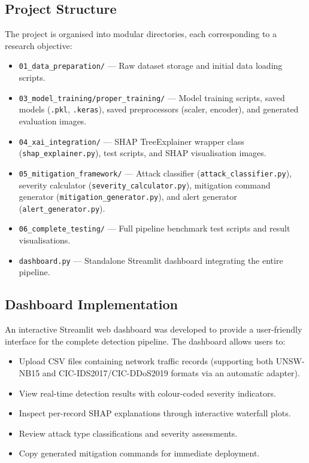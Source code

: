 \subsection{Project Structure}

The project is organised into modular directories, each corresponding to a research objective:

\begin{itemize}
    \item \texttt{01\_data\_preparation/} --- Raw dataset storage and initial data loading scripts.
    \item \texttt{03\_model\_training/proper\_training/} --- Model training scripts, saved models (\texttt{.pkl}, \texttt{.keras}), saved preprocessors (scaler, encoder), and generated evaluation images.
    \item \texttt{04\_xai\_integration/} --- SHAP TreeExplainer wrapper class (\texttt{shap\_explainer.py}), test scripts, and SHAP visualisation images.
    \item \texttt{05\_mitigation\_framework/} --- Attack classifier (\texttt{attack\_classifier.py}), severity calculator (\texttt{severity\_calculator.py}), mitigation command generator (\texttt{mitigation\_generator.py}), and alert generator (\texttt{alert\_generator.py}).
    \item \texttt{06\_complete\_testing/} --- Full pipeline benchmark test scripts and result visualisations.
    \item \texttt{dashboard.py} --- Standalone Streamlit dashboard integrating the entire pipeline.
\end{itemize}

\subsection{Dashboard Implementation}

An interactive Streamlit web dashboard was developed to provide a user-friendly interface for the complete detection pipeline. The dashboard allows users to:
\begin{itemize}
    \item Upload CSV files containing network traffic records (supporting both UNSW-NB15 and CIC-IDS2017/CIC-DDoS2019 formats via an automatic adapter).
    \item View real-time detection results with colour-coded severity indicators.
    \item Inspect per-record SHAP explanations through interactive waterfall plots.
    \item Review attack type classifications and severity assessments.
    \item Copy generated mitigation commands for immediate deployment.
\end{itemize}

